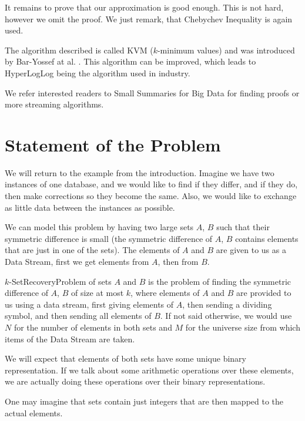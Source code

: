 It remains to prove that our approximation is good enough. This is not hard, however we omit the proof. We just remark, that Chebychev Inequality is again used.

The algorithm described is called KVM ($k$-minimum values) and was introduced by Bar-Yossef at al. \cite{bar2002counting}.
This algorithm can be improved, which leads to HyperLogLog being the algorithm used in industry.  \cite{flajolet2007hyperloglog}

We refer interested readers to Small Summaries for Big Data \cite{cormode2020small} for finding proofs or more streaming algorithms.

\section{Statement of the Problem}

We will return to the example from the introduction. Imagine we have two instances of one database, and we would like to find if they differ, and if they do, then make corrections so they become the same. Also, we would like to exchange as little data between the instances as possible.

We can model this problem by having two large sets \(A\), \(B\) such that their symmetric difference is small (the symmetric difference of \(A\), \(B\) contains elements that are just in one of the sets). The elements of \(A\) and \(B\) are given to us as a Data Stream, first we get elements from \(A\), then from \(B\).

\begin{defn}
    \(k\)-SetRecoveryProblem of sets \(A\) and \(B\) is the problem of finding the symmetric difference of \(A\), \(B\) of size at most \(k\), where elements of \(A\) and \(B\) are provided to us using a data stream, first giving elements of \(A\), then sending a dividing symbol, and then sending all elements of \(B\). If not said otherwise, we would use \(N\) for the number of elements in both sets and \(M\) for the universe size from which items of the Data Stream are taken.
\end{defn}

We will expect that elements of both sets have some unique binary representation. If we talk about some arithmetic operations over these elements, we are actually doing these operations over their binary representations.

One may imagine that sets contain just integers that are then mapped to the actual elements.

